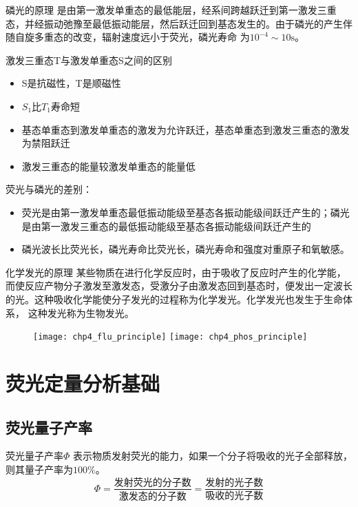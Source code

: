 \begin{definition*}{磷光的原理}
	是由第一激发单重态的最低能层，经系间跨越跃迁到第一激发三重态，并经振动弛豫至最低振动能层，然后跃迁回到基态发生的。由于磷光的产生伴随自旋多重态的改变，辐射速度远小于荧光，磷光寿命 为$10^{-4}\sim 10 \mathrm{s}$。
\end{definition*}
激发三重态T与激发单重态S之间的区别
\begin{itemize}
	\item S是抗磁性，T是顺磁性
	\item $S_1$比$T_1$寿命短
	\item 基态单重态到激发单重态的激发为允许跃迁，基态单重态到激发三重态的激发为禁阻跃迁
	\item 激发三重态的能量较激发单重态的能量低
\end{itemize}
\begin{note}
	荧光与磷光的差别：
	\begin{itemize}
		\item 荧光是由第一激发单重态最低振动能级至基态各振动能级间跃迁产生的；磷光是由第一激发三重态的最低振动能级至基态各振动能级间跃迁产生的
		\item 磷光波长比荧光长，磷光寿命比荧光长，磷光寿命和强度对重原子和氧敏感。
	\end{itemize}
\end{note}
\begin{definition*}{化学发光的原理}
	某些物质在进行化学反应时，由于吸收了反应时产生的化学能，而使反应产物分子激发至激发态，受激分子由激发态回到基态时，便发出一定波长的光。这种吸收化学能使分子发光的过程称为化学发光。化学发光也发生于生命体系， 这种发光称为生物发光。
\end{definition*}
\begin{figure}
	\centering
	\texttt{[image: chp4\_flu\_principle]}
	\label{fig:chp4fluprinciple}
	\texttt{[image: chp4\_phos\_principle]}
	\label{fig:chp4phosprinciple}
	\caption{}
\end{figure}



\section{荧光定量分析基础}
\subsection{荧光量子产率}

\begin{definition*}{荧光量子产率$\Phi$}{}
	 表示物质发射荧光的能力，如果一个分子将吸收的光子全部释放，则其量子产率为$100\%$。
	\begin{equation*}
		\Phi =\frac{\text{发射荧光的分子数}}{\text{激发态的分子数}}=\frac{\text{发射的光子数}}{\text{吸收的光子数}}
	\end{equation*}
\end{definition*}

